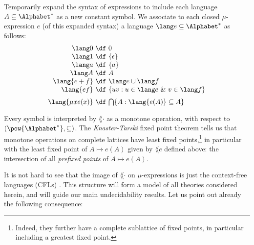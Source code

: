 \begin{example}
    [Languages]
    \label{language-model}
    Temporarily expand the syntax of expressions to include each language $A\subseteq \Alphabet^*$ as a new constant symbol.
    We associate to each closed $\mu$-expression $e$ (of this expanded syntax) a language $\lang e \subseteq \Alphabet^*$ as follows:
    \[
    \begin{array}{r@{\ \df \ }l}
         \lang 0 & 0 \\
         \lang 1 & \{\epsilon\} \\
         \lang a & \{a\} \\
         \lang A & A\\
         \lang {e+f} & \lang e \cup \lang f \\
          \lang {ef} & \{ uv : u \in \lang e \ \& \ v \in \lang f\} \\
         \noalign{\medskip}
          \lang {\mu x e(x)} & \bigcap\{ A : \lang {e(A)} \subseteq A \}
    \end{array}
    \]
\end{example}
Every symbol is interpreted by $\lang\cdot$ as a monotone operation, with respect to $(\pow {\Alphabet^*}, \subseteq)$.
The \emph{Knaster-Tarski} fixed point theorem tells us that monotone operations on complete lattices have least fixed points,\footnote{Indeed, they further have a complete sublattice of fixed points, in particular including a greatest fixed point.} in particular with the least fixed point of $A \mapsto e(A)$ given by $\lang e $ defined above: the intersection of all \emph{prefixed points} of $A \mapsto e(A)$.

It is not hard to see that the image of $\lang \cdot$ on $\mu$-expressions is just the context-free languages (CFLs) \cite{Gruska71:cfls-by-mu-exprs}.
This structure will form a model of all theories considered herein, and will guide our main undecidability results.
Let us point out already the following consequence:


